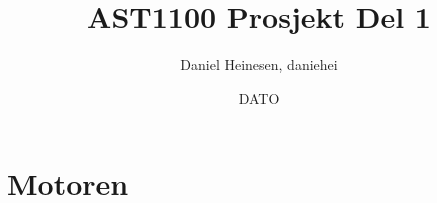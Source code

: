 \documentclass[a4paper,norsk,11pt,twoside]{article}
\date{DATO}
\title{AST1100 Prosjekt Del 1}
\author{Daniel Heinesen, daniehei}
\begin{document}
\maketitle
\newpage



\tableofcontents{}


 

% 
%
% 
%
%
%
%
%
%
%
%
%
%
%

\newpage
\part{Motoren}
\newpage
\end{document}

